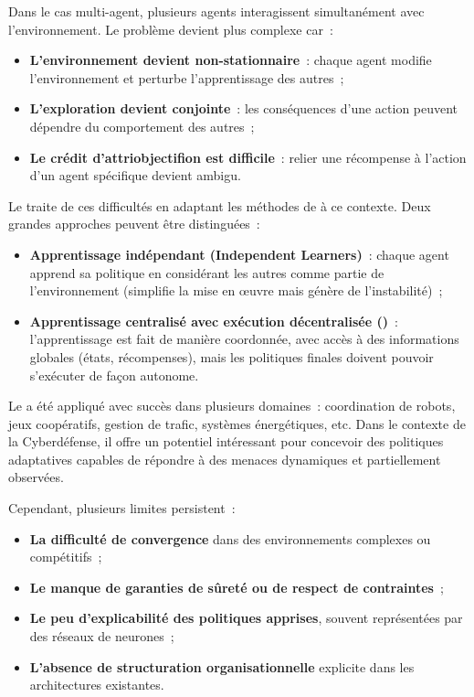 Dans le cas multi-agent, plusieurs agents interagissent simultanément avec l'environnement. Le problème devient plus complexe car~:
\begin{itemize}
  \item \textbf{L'environnement devient non-stationnaire}~: chaque agent modifie l'environnement et perturbe l'apprentissage des autres~;
  \item \textbf{L'exploration devient conjointe}~: les conséquences d'une action peuvent dépendre du comportement des autres~;
  \item \textbf{Le crédit d'attriobjectifion est difficile}~: relier une récompense à l'action d'un agent spécifique devient ambigu.
\end{itemize}

Le  traite de ces difficultés en adaptant les méthodes de  à ce contexte. Deux grandes approches peuvent être distinguées~:
\begin{itemize}
  \item \textbf{Apprentissage indépendant (Independent Learners)}~: chaque agent apprend sa politique en considérant les autres comme partie de l'environnement (simplifie la mise en œuvre mais génère de l'instabilité)~;
  \item \textbf{Apprentissage centralisé avec exécution décentralisée ()}~: l'apprentissage est fait de manière coordonnée, avec accès à des informations globales (états, récompenses), mais les politiques finales doivent pouvoir s'exécuter de façon autonome.
\end{itemize}


Le  a été appliqué avec succès dans plusieurs domaines~: coordination de robots, jeux coopératifs, gestion de trafic, systèmes énergétiques, etc. Dans le contexte de la Cyberdéfense, il offre un potentiel intéressant pour concevoir des politiques adaptatives capables de répondre à des menaces dynamiques et partiellement observées.

Cependant, plusieurs limites persistent~:
\begin{itemize}
  \item \textbf{La difficulté de convergence} dans des environnements complexes ou compétitifs~;
  \item \textbf{Le manque de garanties de sûreté ou de respect de contraintes}~;
  \item \textbf{Le peu d'explicabilité des politiques apprises}, souvent représentées par des réseaux de neurones~;
  \item \textbf{L'absence de structuration organisationnelle} explicite dans les architectures existantes.
\end{itemize}

